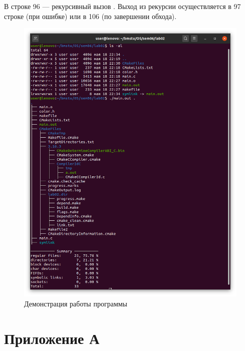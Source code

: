 \documentclass[a4paper,oneside,12pt]{extreport}
\begin{document}


В строке 96 — рекурсивный вызов .
Выход из рекурсии осуществляется в 97 строке (при ошибке) или в 106 (по завершении обхода).



\begin{figure}[H]
	\centering
	\includegraphics[width=0.9954\linewidth]{inc/img/tree}
	\caption{Демонстрация работы программы}
	\label{img:tree}
\end{figure}

\section*{Приложение А}


\end{document}
